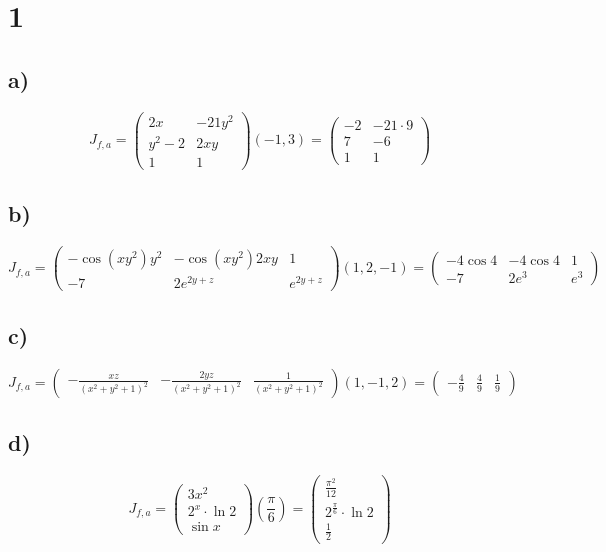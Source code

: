 

	\section*{1}
	\subsection*{a)}
	$$J_{f,a}=\begin{pmatrix}
		2x & -21y^2\\
		y^2-2 & 2xy\\
		1 & 1
	\end{pmatrix}(-1, 3) = \begin{pmatrix}
	-2 & -21\cdot9\\
	7 & -6\\
	1 & 1
	\end{pmatrix}$$
	\subsection*{b)}
	$$J_{f,a}=\begin{pmatrix}
		-\cos{(xy^2)}y^2 & -\cos{(xy^2)}2xy & 1\\
		-7 & 2e^{2y+z} & e^{2y+z}
	\end{pmatrix}(1, 2, -1)= \begin{pmatrix}
	-4\cos{4} & -4\cos{4} & 1 \\
	-7 & 2e^3 & e^3
	\end{pmatrix}$$
	\subsection*{c)}
	$$J_{f,a}=\begin{pmatrix}
		-\frac{xz}{(x^2+y^2+1)^2 } & 	-\frac{2yz}{(x^2+y^2+1)^2 } & 	\frac{1}{(x^2+y^2+1)^2 }  
	\end{pmatrix}(1,-1, 2) = \begin{pmatrix}
	-\frac49 & \frac49 & \frac19
	\end{pmatrix}$$
	\subsection*{d)}
	$$J_{f,a}= \begin{pmatrix}
		3x^2 \\
		2^x\cdot\ln2 \\
		\sin{x}
	\end{pmatrix}(\frac{\pi}{6}) = \begin{pmatrix}
	\frac{\pi^2}{12} \\
	2^{\frac{\pi}{6}}\cdot\ln2 \\
	\frac12
	\end{pmatrix}$$
